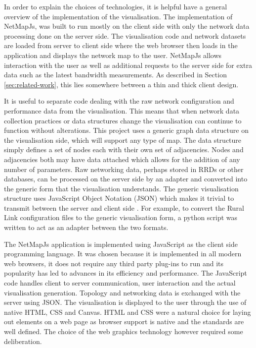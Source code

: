 \documentclass[11pt, a4paper]{article}
\begin{document}
In order to explain the choices of technologies, it is helpful have a general
overview of the implementation of the visualisation. The implementation of
NetMapJs, was built to run mostly on the client side with only the network data
processing done on the server side. The visualisation code and network datasets
are loaded from server to client side where the web browser then loads in the
application and displays the network map to the user. NetMapJs allows
interaction with the user as well as additional requests to the server side for
extra data such as the latest bandwidth measurements. As described in Section
\ref{sec:related-work}, this lies somewhere between a thin and thick client
design.

It is useful to separate code dealing with the raw network configuration and
performance data from the visualisation. This means that when network data
collection practices or data structures change the visualisation can continue to
function without alterations. This project uses a generic graph data structure
on the visualisation side, which will support any type of map. The data
structure simply defines a set of nodes each with their own set of adjacencies.
Nodes and adjacencies both may have data attached which allows for the addition
of any number of parameters. Raw networking data, perhaps stored in RRDs or
other databases, can be processed on the server side by an adapter and converted
into the generic form that the visualisation understands. The generic
visualisation structure uses JavaScript Object Notation (JSON) which makes it
trivial to transmit between the server and client side \cite{rfc4627}. For
example, to convert the Rural Link configuration files to the generic
visualisation form, a python script was written to act as an adapter between the
two formats. 

The NetMapJs application is implemented using JavaScript as the client side
programming language. It was chosen because it is implemented in all modern web
browsers, it does not require any third party plug-ins to run and its popularity
has led to advances in its efficiency and performance. The JavaScript code
handles client to server communication, user interaction and the actual
visualisation generation. Topology and networking data is exchanged with the
server using JSON. The visualisation is displayed to the user through the use of
native HTML, CSS and Canvas. HTML and CSS were a natural choice for laying out
elements on a web page as browser support is native and the standards are well
defined. The choice of the web graphics technology however required some
deliberation. 
\end{document}
